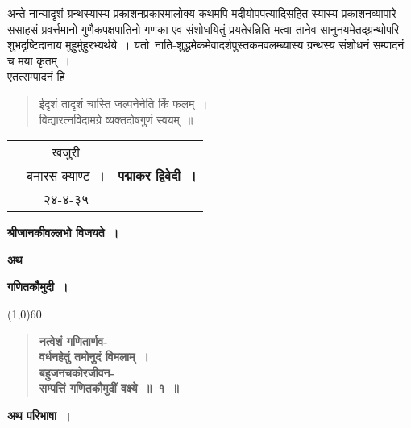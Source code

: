 \documentclass[11pt, openany]{book}
\begin{document}
\begin{sloppypar}
अन्ते नान्यादृशं ग्रन्थस्यास्य प्रकाशनप्रकारमालोक्य कथमपि मदीयोपपत्यादिसहित-स्यास्य प्रकाशनव्यापारे ससाहसं प्रवर्त्तमानो गुणैकपक्षपातिनो गणका एव संशोधयितुं प्रयतेरन्निति मत्वा तानेव सानुनयमेतद्ग्रन्थोपरि शुभदृष्टिदानाय मुहुर्मुहुरभ्यर्थये~। यतो~नाति-शुद्धमेकमेवादर्शपुस्तकमवलम्ब्यास्य ग्रन्थस्य संशोधनं सम्पादनं च मया कृतम्~।\\

एतत्सम्पादनं हि\textendash 

\begin{quote}
{\color{violet}ईदृशं तादृशं चास्ति जल्पनेनेति किं फलम्~।\\
विद्यारत्नविदामग्रे व्यक्तदोषगुणं स्वयम्~॥}
\end{quote}
\vspace{8mm}

\begin{tabular}{ccr}
\hspace{10mm} & खजुरी & \\
 & बनारस क्याण्ट~। & \hspace{35mm} {\large \textbf{पद्माकर द्विवेदी~।}} \\ 
 & २४-४-३५
\end{tabular}
\end{sloppypar}

\newpage
\thispagestyle{empty}

\begin{center}
\textbf{श्रीजानकीवल्लभो विजयते~।}
\vspace{5mm}

{\small \textbf{अथ}}
\vspace{4mm}

{\LARGE \textbf{गणितकौमुदी~।}}
\vspace{4mm}

\line(1,0){60}
\end{center}
\vspace{2mm}

 \label{1.1}
\begin{quote}
{\large \textbf{{\color{purple}नत्वेशं गणितार्णव-\\
वर्धनहेतुं तमोनुदं विमलाम्~।\\
बहुजनचकोरजीवन-\\
सम्पत्तिं गणितकौमुदीं वक्ष्ये~॥~१~॥}}}
\end{quote}
\vspace{-2mm}
 
\begin{center}
\textbf{अथ परिभाषा~।}
\end{center}
\vspace{-2mm}
\end{document}
